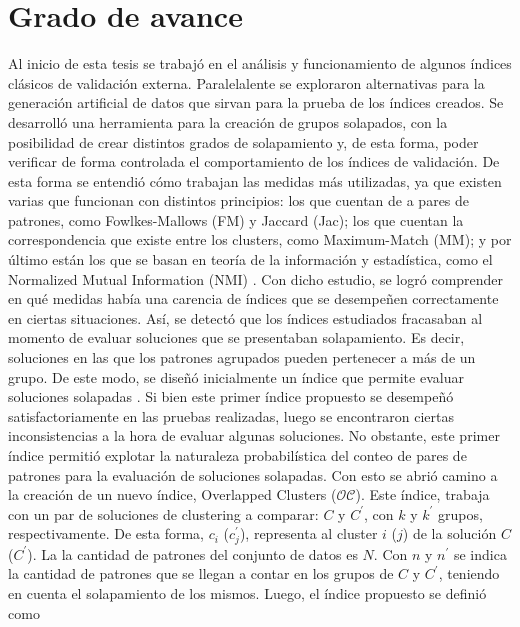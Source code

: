 \documentclass[a4paper,8pt]{article}
\begin{document}
\section{Grado de avance}
Al inicio de esta tesis se trabajó en el análisis y funcionamiento de algunos índices clásicos 
de validación externa. Paralelalente se exploraron alternativas para la generación artificial de datos que sirvan para la prueba de los índices creados. Se desarrolló una herramienta para la creación de grupos solapados, con la posibilidad de crear distintos grados de solapamiento y, de esta forma, poder verificar de forma controlada el comportamiento de los índices de validación.
De esta forma se entendió cómo trabajan las medidas más utilizadas, ya que existen varias que funcionan con distintos principios: los que cuentan de a pares de patrones, como Fowlkes-Mallows (FM)\cite{fowlkes_method_1983} y Jaccard (Jac)\cite{jac01}; los que cuentan la correspondencia que existe entre los clusters, como Maximum-Match (MM)\cite{meila_experimental_2001}; y por último están los  que se basan en teoría de la información y estadística, como el Normalized Mutual Information (NMI) \cite{vinh_information_2009}. Con dicho estudio, se logró comprender en qué medidas había una carencia de índices que se desempeñen correctamente en ciertas situaciones. Así, se detectó que los índices estudiados fracasaban
al momento de evaluar soluciones que se presentaban solapamiento. Es decir, soluciones en las 
que los patrones agrupados pueden pertenecer a más de un grupo.	De este modo, se diseñó inicialmente un índice
 que permite evaluar soluciones solapadas \cite{csm2014}. Si bien este
primer índice propuesto se desempeñó satisfactoriamente en las pruebas realizadas, luego se encontraron ciertas inconsistencias
a la hora de evaluar algunas soluciones. No obstante, este primer índice permitió explotar la naturaleza probabilística
del conteo de pares de patrones para la evaluación de soluciones solapadas. Con esto se abrió camino
a la creación de un nuevo índice, Overlapped Clusters ($\mathcal{OC}$)\cite{csm2016}. 
Este índice, trabaja con un par de soluciones de clustering a comparar: $C$ y $C^\prime$, con 
$k$ y $k^\prime$ grupos, respectivamente. De esta forma, $c_i$ ($c^\prime_j$), representa al cluster $i$ ($j$) de la solución $C$ ($C^\prime$).
La la cantidad de patrones del conjunto de datos es $N$. Con $n$ y $n^\prime$ se indica la cantidad de patrones que se llegan a contar en los grupos de $C$ y $C^\prime$, teniendo en cuenta el solapamiento de los mismos.
Luego, el índice propuesto se definió como
\end{document}
